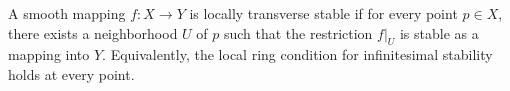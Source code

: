 A smooth mapping $f: X \to Y$ is locally transverse stable if for every point $p \in X$, there exists a neighborhood $U$ of $p$ such that the restriction $f|_U$ is stable as a mapping into $Y$. Equivalently, the local ring condition for infinitesimal stability holds at every point.
